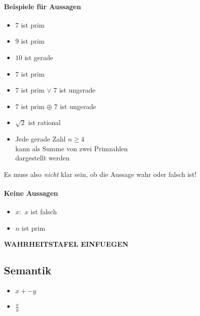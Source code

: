 \paragraph{Beispiele für Aussagen}
\begin{itemize}
\item \glqq $7$ ist prim\grqq{}
\item \glqq $9$ ist prim\grqq{}
\item \glqq $10$ ist gerade\grqq{}
\item \glqq $7$ ist prim\grqq{}
\item \glqq $7$ ist prim $\lor$ $7$ ist ungerade\grqq{}
\item \glqq $7$ ist prim $\oplus$ $7$ ist ungerade\grqq{}
\item \glqq $\sqrt{2}$ ist rational\grqq{}
\item \glqq Jede gerade Zahl $n\geq 4$\\
kann als Summe von zwei Primzahlen\\
dargestellt werden\grqq{}
\end{itemize}
%
Es muss also \emph{nicht} klar sein, ob die Aussage wahr oder falsch ist!
%
\paragraph{Keine Aussagen}
\begin{itemize}
\item \glqq $x:$ $x$ ist falsch\grqq{}
\item \glqq $n$ ist prim\grqq{}
\end{itemize}
%
\textbf{WAHRHEITSTAFEL EINFUEGEN}
\subsection{Semantik}
\begin{itemize}
\item \( x + - y \)
\item \( \frac{x}{y} \)
\end{itemize}
%
